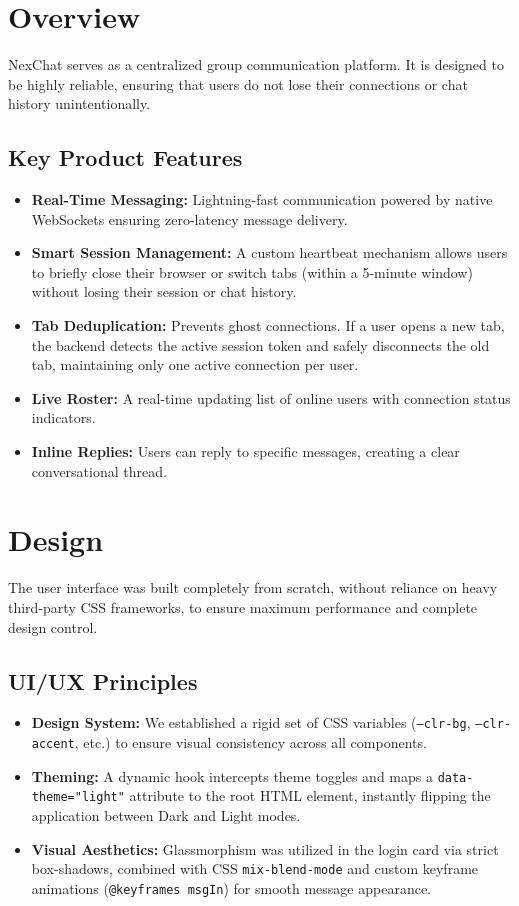 \documentclass[12pt, a4paper]{article}
\begin{document}
\section{Overview}
NexChat serves as a centralized group communication platform. It is designed to be highly reliable, ensuring that users do not lose their connections or chat history unintentionally.

\subsection{Key Product Features}
\begin{itemize}
    \item \textbf{Real-Time Messaging:} Lightning-fast communication powered by native WebSockets ensuring zero-latency message delivery.
    \item \textbf{Smart Session Management:} A custom heartbeat mechanism allows users to briefly close their browser or switch tabs (within a 5-minute window) without losing their session or chat history.
    \item \textbf{Tab Deduplication:} Prevents ghost connections. If a user opens a new tab, the backend detects the active session token and safely disconnects the old tab, maintaining only one active connection per user.
    \item \textbf{Live Roster:} A real-time updating list of online users with connection status indicators.
    \item \textbf{Inline Replies:} Users can reply to specific messages, creating a clear conversational thread.
\end{itemize}

\section{Design}
The user interface was built completely from scratch, without reliance on heavy third-party CSS frameworks, to ensure maximum performance and complete design control.

\subsection{UI/UX Principles}
\begin{itemize}
    \item \textbf{Design System:} We established a rigid set of CSS variables (\texttt{--clr-bg}, \texttt{--clr-accent}, etc.) to ensure visual consistency across all components.
    \item \textbf{Theming:} A dynamic hook intercepts theme toggles and maps a \texttt{data-theme="light"} attribute to the root HTML element, instantly flipping the application between Dark and Light modes.
    \item \textbf{Visual Aesthetics:} Glassmorphism was utilized in the login card via strict box-shadows, combined with CSS \texttt{mix-blend-mode} and custom keyframe animations (\texttt{@keyframes msgIn}) for smooth message appearance.
\end{itemize}
\end{document}
